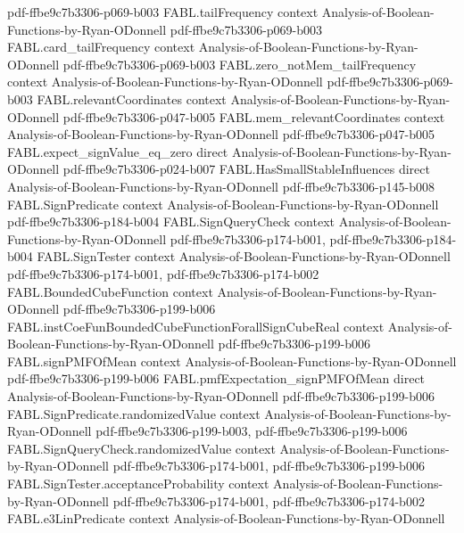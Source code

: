 \begin{theorem}
  {pdf-ffbe9c7b3306-p069-b003}
\proofstep
  {FABL.tailFrequency}
  {context}
  {Analysis-of-Boolean-Functions-by-Ryan-ODonnell}
  {pdf-ffbe9c7b3306-p069-b003}
\proofstep
  {FABL.card_tailFrequency}
  {context}
  {Analysis-of-Boolean-Functions-by-Ryan-ODonnell}
  {pdf-ffbe9c7b3306-p069-b003}
\proofstep
  {FABL.zero_notMem_tailFrequency}
  {context}
  {Analysis-of-Boolean-Functions-by-Ryan-ODonnell}
  {pdf-ffbe9c7b3306-p069-b003}
\proofstep
  {FABL.relevantCoordinates}
  {context}
  {Analysis-of-Boolean-Functions-by-Ryan-ODonnell}
  {pdf-ffbe9c7b3306-p047-b005}
\proofstep
  {FABL.mem_relevantCoordinates}
  {context}
  {Analysis-of-Boolean-Functions-by-Ryan-ODonnell}
  {pdf-ffbe9c7b3306-p047-b005}
\proofstep
  {FABL.expect_signValue_eq_zero}
  {direct}
  {Analysis-of-Boolean-Functions-by-Ryan-ODonnell}
  {pdf-ffbe9c7b3306-p024-b007}
\proofstep
  {FABL.HasSmallStableInfluences}
  {direct}
  {Analysis-of-Boolean-Functions-by-Ryan-ODonnell}
  {pdf-ffbe9c7b3306-p145-b008}
\proofstep
  {FABL.SignPredicate}
  {context}
  {Analysis-of-Boolean-Functions-by-Ryan-ODonnell}
  {pdf-ffbe9c7b3306-p184-b004}
\proofstep
  {FABL.SignQueryCheck}
  {context}
  {Analysis-of-Boolean-Functions-by-Ryan-ODonnell}
  {pdf-ffbe9c7b3306-p174-b001,
    pdf-ffbe9c7b3306-p184-b004}
\proofstep
  {FABL.SignTester}
  {context}
  {Analysis-of-Boolean-Functions-by-Ryan-ODonnell}
  {pdf-ffbe9c7b3306-p174-b001,
    pdf-ffbe9c7b3306-p174-b002}
\proofstep
  {FABL.BoundedCubeFunction}
  {context}
  {Analysis-of-Boolean-Functions-by-Ryan-ODonnell}
  {pdf-ffbe9c7b3306-p199-b006}
\proofstep
  {FABL.instCoeFunBoundedCubeFunctionForallSignCubeReal}
  {context}
  {Analysis-of-Boolean-Functions-by-Ryan-ODonnell}
  {pdf-ffbe9c7b3306-p199-b006}
\proofstep
  {FABL.signPMFOfMean}
  {context}
  {Analysis-of-Boolean-Functions-by-Ryan-ODonnell}
  {pdf-ffbe9c7b3306-p199-b006}
\proofstep
  {FABL.pmfExpectation_signPMFOfMean}
  {direct}
  {Analysis-of-Boolean-Functions-by-Ryan-ODonnell}
  {pdf-ffbe9c7b3306-p199-b006}
\proofstep
  {FABL.SignPredicate.randomizedValue}
  {context}
  {Analysis-of-Boolean-Functions-by-Ryan-ODonnell}
  {pdf-ffbe9c7b3306-p199-b003,
    pdf-ffbe9c7b3306-p199-b006}
\proofstep
  {FABL.SignQueryCheck.randomizedValue}
  {context}
  {Analysis-of-Boolean-Functions-by-Ryan-ODonnell}
  {pdf-ffbe9c7b3306-p174-b001,
    pdf-ffbe9c7b3306-p199-b006}
\proofstep
  {FABL.SignTester.acceptanceProbability}
  {context}
  {Analysis-of-Boolean-Functions-by-Ryan-ODonnell}
  {pdf-ffbe9c7b3306-p174-b001,
    pdf-ffbe9c7b3306-p174-b002}
\proofstep
  {FABL.e3LinPredicate}
  {context}
  {Analysis-of-Boolean-Functions-by-Ryan-ODonnell}

\end{theorem}
